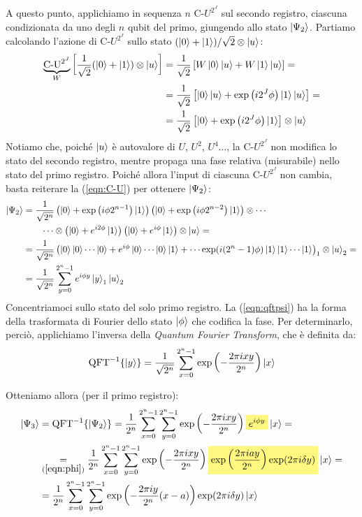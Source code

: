 \documentclass[../../InformazioneQuantistica.tex]{subfiles}
\begin{document}
A questo punto, applichiamo in sequenza $n$ C-$U^{2^J}$ sul secondo registro, ciascuna condizionata da uno degli $n$ qubit del primo, giungendo allo stato $\Ket{\Psi_2}$. Partiamo calcolando l'azione di C-$U^{2^J}$ sullo stato $(\Ket{0}+\Ket{1})/\sqrt{2}\otimes\Ket{u}$:
\begin{align} \nonumber
\underbrace{\operatorname{C-U}^{2^J}}_{W} \left[\frac{1}{\sqrt{2}}(\Ket{0}+\Ket{1})\otimes \Ket{u}\right] &= \frac{1}{\sqrt{2}} \left[W\Ket{0}\Ket{u} + W\Ket{1}\Ket{u}\right] = \\ \nonumber
&= \frac{1}{\sqrt{2}}\left[\Ket{0}\Ket{u} + \exp\left(i2^J \phi\right) \Ket{1}\Ket{u}\right] =\\
&=\frac{1}{\sqrt{2}}\left[ \Ket{0} + \exp\left( i 2^J \phi \right) \Ket{1} \right] \otimes \Ket{u}
\label{eqn:C-U}
\end{align}
Notiamo che, poiché $\Ket{u}$ è autovalore di $U$, $U^2$, $U^4$..., la C-$U^{2^J}$ non modifica lo stato del secondo registro, mentre propaga una fase relativa (misurabile) nello stato del primo registro. Poiché allora l'input di ciascuna C-$U^{2^J}$ non cambia, basta reiterare la (\ref{eqn:C-U}) per ottenere $\Ket{\Psi_2}$:
\begin{align} \nonumber
\Ket{\Psi_2} &= \frac{1}{\sqrt{2^n}} \left( \Ket{0} + \exp\left(i \phi 2^{n-1}\right) \Ket{1}\right) \left(\Ket{0} + \exp\left( i \phi 2^{n-2}\right) \Ket{1}\right) \otimes \cdots\\ \nonumber
&\qquad \cdots \otimes \left( \Ket{0} + e^{i2\phi} \Ket{1}\right)\left( \Ket{0} + e^{i\phi}\Ket{1}\right) \otimes \Ket{u} =\\ \nonumber 
&= \frac{1}{\sqrt{2^n}}\left( \Ket{0}\Ket{0}\cdots \Ket{0} + e^{i\phi}\Ket{0}\cdots \Ket{0}\Ket{1} + \cdots 
\exp({i(2^n-1)\phi})\Ket{1}\Ket{1}\cdots \Ket{1} \right)_1 \otimes \Ket{u}_2 = \\
&= \frac{1}{\sqrt{2^n}} \sum_{y=0}^{2^n-1} e^{i\phi y} \Ket{y}_1\Ket{u}_2 \label{eqn:qftpsi}
\end{align}
Concentriamoci sullo stato del solo primo registro. La (\ref{eqn:qftpsi}) ha la forma della trasformata di Fourier dello stato $\Ket{\phi}$ che codifica la fase. Per determinarlo, perciò, applichiamo l'inversa della \textit{Quantum Fourier Transform}, che è definita da:
\begin{align*}
\operatorname{QFT}^{-1}\{\Ket{y}\} = \frac{1}{\sqrt{2^n}} \sum_{x=0}^{2^{n}-1} \exp\left(-\frac{2\pi i xy}{2^n}\right) \Ket{x}
\end{align*}

Otteniamo allora (per il primo registro):
\begin{align*}
    \ket{\Psi_3} &= \op{QFT}^{-1}\{\ket{\Psi_2}\} = \frac{1}{2^n} \sum_{x=0}^{2^n-1} \sum_{y=0}^{2^n-1} \exp\left(-\frac{2\pi i xy}{2^n}\right) \hlc{Yellow}{e^{i\phi y}} \ket{x} = \\
    & \underset{(\ref{eqn:phi})}{=} \frac{1}{2^n} \sum_{x=0}^{2^n-1} \sum_{y=0}^{2^n-1} \exp\left(-\frac{2\pi i xy}{2^n}\right) \hlc{Yellow}{\exp\left( \frac{2\pi i ay}{2^n}\right) \exp(2\pi i \delta y)} \ket{x} =\\
    &= \frac{1}{2^n} \sum_{x=0}^{2^n-1} \sum_{y=0}^{2^n-1} \exp\left( -\frac{2\pi i y}{2^n}(x-a) \right) \exp(2\pi i \delta y ) \ket{x}
\end{align*}
\end{document}
